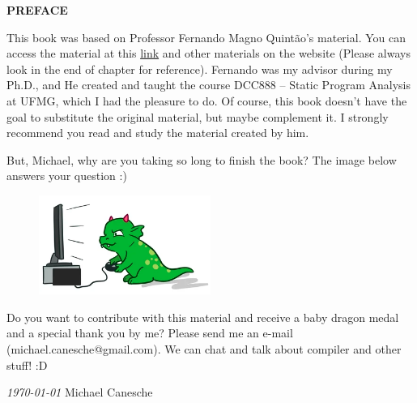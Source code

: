\begin{center}
    \textbf{\Large{PREFACE}}
\end{center}

This book was based on Professor Fernando Magno Quintão's material. You can access the material at this \hyperlink{https://homepages.dcc.ufmg.br/~fernando/classes/dcc888/}{link} and other materials on the website (Please always look in the end of chapter for reference). Fernando was my advisor during my Ph.D., and He created and taught the course DCC888 – Static Program Analysis at UFMG, which I had the pleasure to do. Of course, this book doesn't have the goal to substitute the original material, but maybe complement it. I strongly recommend you read and study the material created by him.

But, Michael, why are you taking so long to finish the book? The image below answers your question :)

\begin{figure}[!ht]
    \centering
    \includegraphics[width=0.5\textwidth]{img/dragon.png}
\end{figure}

Do you want to contribute with this material and receive a baby dragon medal and a special thank you by me? Please send me an e-mail (michael.canesche@gmail.com). We can chat and talk about compiler and other stuff! :D 

\vspace{\baselineskip}

\textit{\today} \hfill Michael Canesche